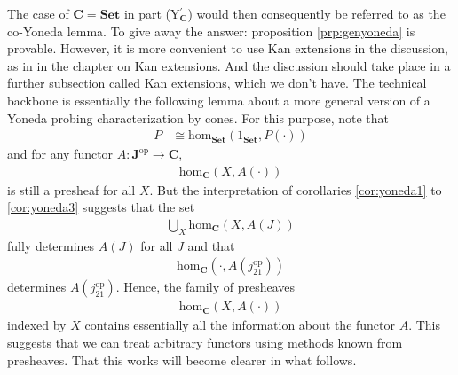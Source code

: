 The case of $\mathbf{C} = \mathbf{Set}$ in part (Y$_{\mathbf{C}}^{\prime}$) would then consequently be referred to as the co-Yoneda lemma.
To give away the answer: proposition \ref{prp:genyoneda} is provable.
However, it is more convenient to use Kan extensions in the discussion, as in \cite{52fbba46} in the chapter on Kan extensions.
And the discussion should take place in a further subsection called {\glqq}Kan extensions,{\grqq} which we don't have.
The technical backbone is essentially the following lemma about a more general version of a Yoneda probing characterization by cones.
For this purpose, note that
\begin{align*}
  P
  &\cong
  \mathrm{hom}_{\mathbf{Set}}(1_{\mathbf{Set}},P(\cdot))
\end{align*}
and for any functor $A \colon \mathbf{J}^{\textrm{op}} \to \mathbf{C}$,
\begin{align*}
  \mathrm{hom}_{\mathbf{C}}(X,A(\cdot))
\end{align*}
is still a presheaf for all $X$.
But the interpretation of corollaries \ref{cor:yoneda1} to \ref{cor:yoneda3} suggests that the set
\begin{align*}
  \bigcup_{X}
  \mathrm{hom}_{\mathbf{C}}(X,A(J))
\end{align*}
fully determines $A(J)$ for all $J$ and that
\begin{align*}
  \mathrm{hom}_{\mathbf{C}}
  \left(
    \cdot,
    A(j_{21}^{\textrm{op}})
  \right)
\end{align*}
determines $A(j_{21}^{\textrm{op}})$.
Hence, the family of presheaves
\begin{align*}
  \mathrm{hom}_{\mathbf{C}}(X,A(\cdot))
\end{align*}
indexed by $X$ contains essentially all the information about the functor $A$.
This suggests that we can treat arbitrary functors using methods known from presheaves.
That this works will become clearer in what follows.
\\
